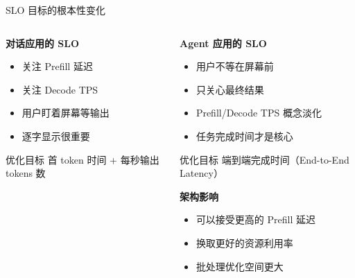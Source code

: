 \documentclass[aspectratio=169,xcolor=dvipsnames]{beamer}
\begin{document}
\begin{frame}{SLO 目标的根本性变化}
  \begin{columns}
    \begin{column}{0.48\textwidth}
      \textbf{对话应用的 SLO}
      \begin{itemize}
        \item 关注 Prefill 延迟
        \item 关注 Decode TPS
        \item 用户盯着屏幕等输出
        \item 逐字显示很重要
      \end{itemize}

      \vspace{0.3cm}

      \begin{block}{优化目标}
        首 token 时间 + 每秒输出 tokens 数
      \end{block}
    \end{column}
    \begin{column}{0.48\textwidth}
      \textbf{Agent 应用的 SLO}
      \begin{itemize}
        \item 用户不等在屏幕前
        \item 只关心最终结果
        \item Prefill/Decode TPS 概念淡化
        \item 任务完成时间才是核心
      \end{itemize}

      \vspace{0.3cm}

      \begin{alertblock}{优化目标}
        端到端完成时间（End-to-End Latency）
      \end{alertblock}

      \vspace{0.3cm}

      \textbf{架构影响}
      \begin{itemize}
        \item 可以接受更高的 Prefill 延迟
        \item 换取更好的资源利用率
        \item 批处理优化空间更大
      \end{itemize}
    \end{column}
  \end{columns}
\end{frame}
\end{document}
